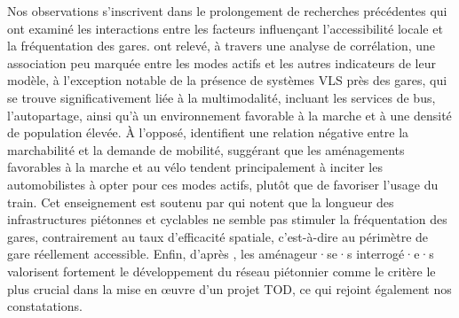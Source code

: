 \begin{refsegment}
Nos observations s'inscrivent dans le prolongement de recherches précédentes qui ont examiné les interactions entre les facteurs influençant l'accessibilité locale et la fréquentation des gares. \textcolor{blue}{\textcite[511]{caset_measuring_2018}} ont relevé, à travers une analyse de corrélation, une association peu marquée entre les modes actifs et les autres indicateurs de leur modèle, à l'exception notable de la présence de systèmes \acrshort{VLS} près des gares, qui se trouve significativement liée à la \gls{multimodalité}, incluant les services de bus, l'autopartage, ainsi qu'à un environnement favorable à la marche et à une densité de population élevée. À l'opposé, \textcolor{blue}{\textcite[8]{olaru_place_2019}} identifient une relation négative entre la marchabilité et la demande de mobilité, suggérant que les aménagements favorables à la marche et au vélo tendent principalement à inciter les automobilistes à opter pour ces modes actifs, plutôt que de favoriser l'usage du train. Cet enseignement est soutenu par \textcolor{blue}{\textcite[7]{caset_integrating_2020}} qui notent que la longueur des infrastructures piétonnes et cyclables ne semble pas stimuler la fréquentation des gares, contrairement au taux d'efficacité spatiale, c'est-à-dire au périmètre de gare réellement accessible. Enfin, d'après \textcolor{blue}{\textcite[1~021]{maheshwari_evaluating_2022}}, les aménageur·se·s interrogé·e·s valorisent fortement le développement du réseau piétonnier comme le critère le plus crucial dans la mise en œuvre d'un projet \acrshort{TOD}, ce qui rejoint également nos constatations.%


\end{refsegment}
